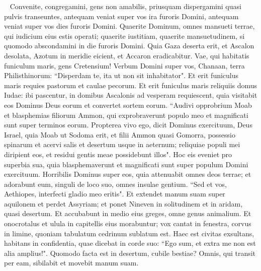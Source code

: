 \begin{biblechapter}   
\verse Convenite, congregamini, gens non amabilis, 
\verse priusquam dispergamini quasi pulvis transeuntes, antequam veniat super vos ira furoris Domini, antequam veniat super vos dies furoris Domini. 
\verse Quaerite Dominum, omnes mansueti terrae, qui iudicium eius estis operati; quaerite iustitiam, quaerite mansuetudinem, si quomodo abscondamini in die furoris Domini. 
\verse Quia Gaza deserta erit, et Ascalon desolata, Azotum in meridie eicient, et Accaron eradicabitur. 
\verse Vae, qui habitatis funiculum maris, gens Cretensium! Verbum Domini super vos, Chanaan, terra Philisthinorum: “Disperdam te, ita ut non sit inhabitator". 
\verse Et erit funiculus maris requies pastorum et caulae pecorum. 
\verse Et erit funiculus maris reliquiis domus Iudae: ibi pascentur, in domibus Ascalonis ad vesperam requiescent, quia visitabit eos Dominus Deus eorum et convertet sortem eorum. 
\verse “Audivi opprobrium Moab et blasphemias filiorum Ammon, qui exprobraverunt populo meo et magnificati sunt super terminos eorum. 
\verse Propterea vivo ego, dicit Dominus exercituum, Deus Israel, quia Moab ut Sodoma erit, et filii Ammon quasi Gomorra, possessio spinarum et acervi salis et desertum usque in aeternum; reliquiae populi mei diripient eos, et residui gentis meae possidebunt illos". 
\verse Hoc eis eveniet pro superbia sua, quia blasphemaverunt et magnificati sunt super populum Domini exercituum. 
\verse Horribilis Dominus super eos, quia attenuabit omnes deos terrae; et adorabunt eum, singuli de loco suo, omnes insulae gentium. 
\verse “Sed et vos, Aethiopes, interfecti gladio meo eritis". 
\verse Et extendet manum suam super aquilonem et perdet Assyriam; et ponet Nineven in solitudinem et in aridam, quasi desertum. 
\verse Et accubabunt in medio eius greges, omne genus animalium. Et onocrotalus et ulula in capitellis eius morabuntur; vox cantat in fenestra, corvus in limine, quoniam tabulatum cedrinum sublatum est. 
\verse Haec est civitas exsultans, habitans in confidentia, quae dicebat in corde suo: “Ego sum, et extra me non est alia amplius!". Quomodo facta est in desertum, cubile bestiae? Omnis, qui transit per eam, sibilabit et movebit manum suam. 
\end{biblechapter}

